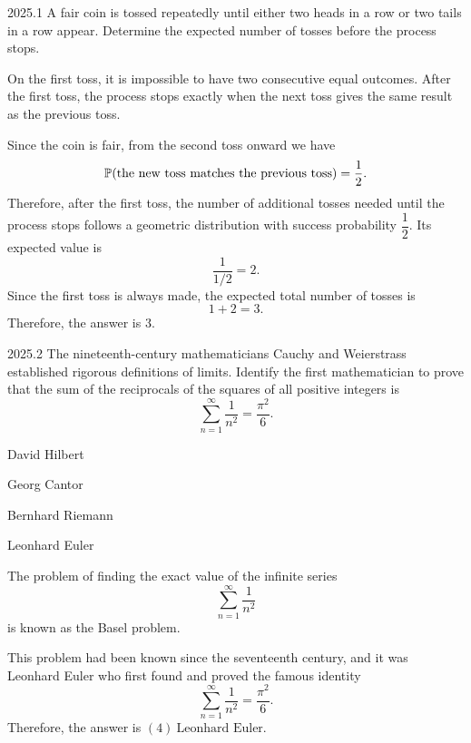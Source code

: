    \begin{pastproblem}{2025.1}
        A fair coin is tossed repeatedly until either two heads in a row or two tails in a row
        appear. Determine the expected number of tosses before the process stops.
    \end{pastproblem}

    \begin{solution}
        On the first toss, it is impossible to have two consecutive equal outcomes. After the first
        toss, the process stops exactly when the next toss gives the same result as the previous
        toss.

        Since the coin is fair, from the second toss onward we have
        \[
            \mathbb{P}(\text{the new toss matches the previous toss})
            =
            \frac{1}{2}.
        \]
        Therefore, after the first toss, the number of additional tosses needed until the process
        stops follows a geometric distribution with success probability $\dfrac{1}{2}$. Its expected
        value is
        \[
            \frac{1}{1/2}=2.
        \]
        Since the first toss is always made, the expected total number of tosses is
        \[
            1+2=3.
        \]
        Therefore, the answer is $\boxed{3}$.
    \end{solution}

    \begin{pastproblem}{2025.2}
        The nineteenth-century mathematicians Cauchy and Weierstrass established rigorous
        definitions of limits. Identify the first mathematician to prove that the sum of the
        reciprocals of the squares of all positive integers is
        \[
            \sum_{n=1}^{\infty}\frac{1}{n^2}
            =
            \frac{\pi^2}{6}.
        \]
        \begin{problemchoices}
            \item David Hilbert
            \item Georg Cantor
            \item Bernhard Riemann
            \item Leonhard Euler
        \end{problemchoices}
    \end{pastproblem}

    \begin{solution}
        The problem of finding the exact value of the infinite series
        \[
            \sum_{n=1}^{\infty}\frac{1}{n^2}
        \]
        is known as the Basel problem.

        This problem had been known since the seventeenth century, and it was Leonhard Euler who
        first found and proved the famous identity
        \[
            \sum_{n=1}^{\infty}\frac{1}{n^2}
            =
            \frac{\pi^2}{6}.
        \]
        Therefore, the answer is $\boxed{(4)\ \text{Leonhard Euler}}$.
    \end{solution}

